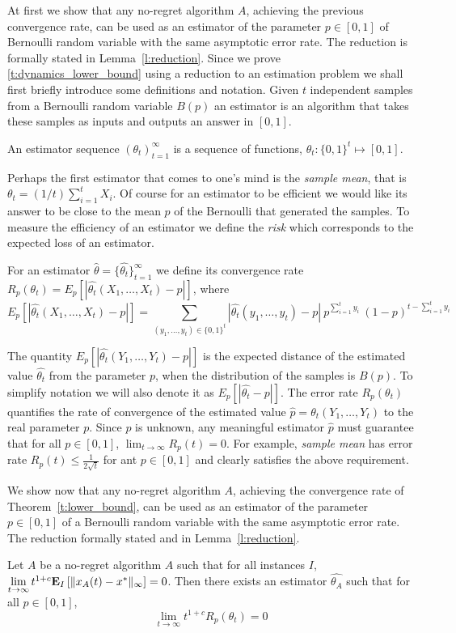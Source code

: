At first we show that any no-regret algorithm $A$, achieving the previous
convergence rate, can be used as an estimator of the parameter
$p \in [0,1] $ of Bernoulli random variable
with the same asymptotic error rate. The reduction is formally stated in
Lemma~\ref{l:reduction}.
Since we prove \ref{t:dynamics_lower_bound} using a reduction to
an estimation problem we shall first briefly introduce some definitions and
notation.
Given $t$ independent samples from a Bernoulli random variable $B(p)$
an estimator is an algorithm that takes these samples as inputs and
outputs an answer in $[0,1]$.
\begin{definition}\label{d:estimator}
  An estimator sequence $(\theta_t)_{t=1}^{\infty}$
  is a sequence of functions, $\theta_t: \{0,1\}^t\mapsto [0,1]$.
\end{definition}
Perhaps the first estimator that comes to one's mind is the
\emph{sample mean}, that is $\theta_t=(1/t) \sum_{i=1}^t X_i$.
Of course for an estimator to be efficient we would like its answer to be
close to the mean $p$ of the Bernoulli that generated the samples.
To measure the efficiency of an estimator we define the \emph{risk}
which corresponds to the expected loss of an estimator.
\begin{definition}\label{d:risk}
  For an estimator $\hat{\theta}
  =\{\hat{\theta_t}\}_{t=1}^\infty$ we define its convergence rate
  $R_p(\theta_t) = E_p[|\hat{\theta_t}(X_1,\ldots,X_t) - p|]$,
  where
  \[
    E_p[|\hat{\theta_t}(X_1,\ldots,X_t) - p|]
    = \sum_{(y_1,\ldots,y_t)\in\{0,1\}^t}
    |\hat{\theta_t}(y_1,\ldots,y_t) -p|\
    p^{\sum_{i=1}^t y_i}\ (1-p)^{t-\sum_{i=1}^t y_i}
  \]
\end{definition}
The quantity $E_p[|\hat{\theta_t}(Y_1,\ldots,Y_t) - p|]$ is the expected distance
of the estimated value $\hat{\theta_t}$ from the parameter $p$, when the
distribution of the samples is $B(p)$.
To simplify notation we will also denote it as $E_p[|\hat{\theta_t} - p|]$.
The error rate $R_p(\theta_t)$ quantifies the rate of
convergence of the estimated value $\hat{p} =\theta_t(Y_1,\ldots,Y_t)$ to the
real parameter $p$.  Since $p$ is unknown, any meaningful estimator $\hat{p}$
must guarantee that for all $p \in [0,1]$, $\lim_{t \to \infty}
R_p(t)=0$. For example, \emph{sample mean} has error rate $R_p(t) \leq
\frac{1}{2\sqrt{t}}$ for ant $p \in [0,1]$ and clearly satisfies the above
requirement.

We show now that any no-regret algorithm $A$, achieving the
convergence rate of Theorem~\ref{t:lower_bound}, can be used as an
estimator of the parameter $p \in [0,1]$ of a Bernoulli random variable with
the same asymptotic error rate.
The reduction formally stated and in Lemma~\ref{l:reduction}.
\begin{lemma}\label{l:reduction}
  Let $A$ be a no-regret algorithm $A$ such that for all instances $I$,
  $\lim \limits_{t \rightarrow \infty} t^{1+c}
  \bm{\mathrm{E}}_{I} \left[ \| x_A(t)-x^* \|_{\infty} \right]=0$.
  Then there exists an estimator $\hat{\theta_A}$ such that
  for all $p \in [0,1]$,
  \[\lim_{t \rightarrow \infty}t^{1+c}R_p(\theta_t)=0\]
\end{lemma}


